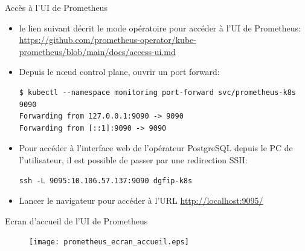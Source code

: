 
\begin{frame}[fragile]{Accès à l'UI de Prometheus}

\begin{itemize}
\item le lien suivant décrit le mode opératoire pour accéder à l'UI de Prometheus: \url{https://github.com/prometheus-operator/kube-prometheus/blob/main/docs/access-ui.md}
\item Depuis le n\oe{}ud control plane, ouvrir un port forward:
\begin{tiny}
\begin{Verbatim}[commandchars=\\\{\}]
$ kubectl --namespace monitoring port-forward svc/prometheus-k8s 9090
Forwarding from 127.0.0.1:9090 -> 9090
Forwarding from [::1]:9090 -> 9090
\end{Verbatim}
\end{tiny}
\item Pour accéder à l'interface web de l'opérateur PostgreSQL depuis le PC de l'utilisateur, il est possible de passer par une redirection SSH:
\begin{tiny}
\begin{Verbatim}[commandchars=\&\{\}]
ssh -L 9095:10.106.57.137:9090 dgfip-k8s
\end{Verbatim}
\end{tiny}
\item Lancer le navigateur pour accéder à l'URL \url{http://localhost:9095/}
\end{itemize}

\end{frame}


\begin{frame}[fragile]{Ecran d'accueil de l'UI de Prometheus}

\begin{figure}
\begin{center}
\texttt{[image: prometheus\_ecran\_accueil.eps]}
\end{center}
\end{figure}

\end{frame}



